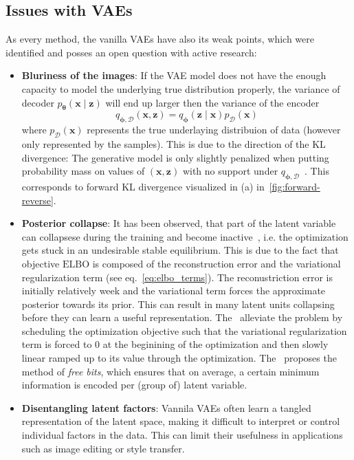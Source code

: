 \subsection{Issues with VAEs}
As every method, the vanilla VAEs have also its weak points, which were identified and posses an open question with active research:
\begin{itemize}
    \item \textbf{Bluriness of the images}: If the VAE model does not have the enough capacity to model the underlying true distribution properly,
    the variance of decoder $p_{\boldsymbol{\theta}}(\boldsymbol{x}\mid \boldsymbol{z})$ will end up larger then the variance of the encoder 
    $$
    q_{\mathbf{\phi},\mathcal{D}}(\boldsymbol{x},\boldsymbol{z}) = q_{\boldsymbol{\phi}}(\mathbf{z}\mid\mathbf{x})p_{\mathcal{D}}(\mathbf{x})
    $$
    where $p_{\mathcal{D}}(\mathbf{x})$ represents the true underlaying distribuion of data (however only represented by the samples).
    This is due to the direction of the KL divergence: The generative model is only slightly penalized when putting probability mass on values 
    of $(\boldsymbol{x},\boldsymbol{z})$ with no support under $q_{\mathbf{\phi},\mathcal{D}}$~\cite{intro-vae-2019}. This corresponds to forward KL
    divergence visualized in (a) in~\ref{fig:forward-reverse}. \label{item:blurriness-of-img}

    \item \textbf{Posterior collapse}: It has been observed, that part of the latent variable can collapsese during the training
    and become inactive~\cite{lvae-2016,iaf-2016,bowmann-2016}, i.e. the optimization gets stuck in an undesirable stable
    equilibrium. This is due to the fact that objective $\mathrm{ELBO}$ is composed of the reconstruction error
    and the variational regularization term (see eq.~\ref{eq:elbo_terms}). The reconustriction error is initially relatively week and 
    the variational term forces the approximate posterior towards its prior. This can result in many latent units collapsing before they 
    can learn a useful representation. 
    The~\cite{lvae-2016} alleviate the problem by scheduling the optimization objective such that the variational regularization term is
    forced to 0 at the beginining of the optimization and then slowly linear ramped up to its value through the optimization. The~\cite{iaf-2016} 
    proposes the method of \textit{free bits}, which ensures that on average, a certain minimum information is encoded per (group of) 
    latent variable. 
    \item \textbf{Disentangling latent factors}: Vannila VAEs often learn a tangled representation of the latent space, making it
    difficult to interpret or control individual factors in the data. This can limit their usefulness in applications such as 
    image editing or style transfer.
\end{itemize}

